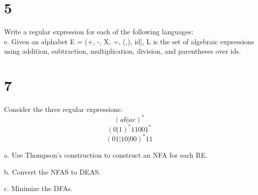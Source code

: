 \documentclass[11pt]{article}
\begin{document}
\begin{Answer}
\end{Answer}

\newpage

\section*{5}
Write a regular expression for each of the following languages: \\ 

e. Given an alphabet E = (+, -, X, ÷, (,), id], L is the set of algebraic expressions using addition, subtraction, multiplication, division, and parentheses over ids.

\begin{Answer}
\end{Answer}

\newpage

\section*{7}
Consider the three regular expressions:
$$(ab | ac)^*$$
$$(0 | 1)^* 1100 1^*$$
$$(01 | 10 | 00)^* 11$$

a. Use Thompson's construction to construct an NFA for each RE. 

\begin{Answer}
\end{Answer}

b. Convert the NFAS to DEAS.

\begin{Answer}
\end{Answer}

c. Minimize the DFAs.

\begin{Answer}
\end{Answer}
\end{document}
